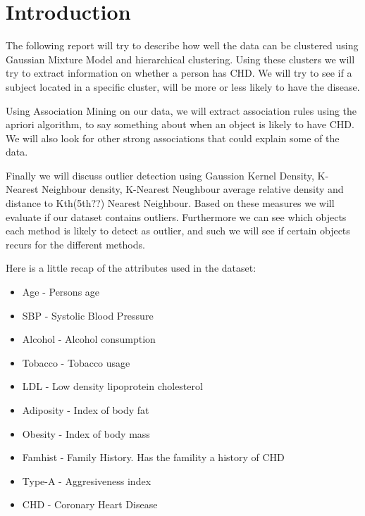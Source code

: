 \section{Introduction}
The following report will try to describe how well the data can be clustered using Gaussian Mixture Model and hierarchical clustering. Using these clusters we will try to extract information on whether a person has CHD. We will try to see if a subject located in a specific cluster, will be more or less likely to have the disease.

Using Association Mining on our data, we will extract association rules using the apriori algorithm, to say something about when an object is likely to have CHD. We will also look for other strong associations that could explain some of the data.

Finally we will discuss outlier detection using Gaussion Kernel Density, K-Nearest Neighbour density, K-Nearest Neughbour average relative density and distance to Kth(5th??) Nearest Neighbour. Based on these measures we will evaluate if our dataset contains outliers. Furthermore we can see which objects each method is likely to detect as outlier, and such we will see if certain objects recurs for the different methods.

Here is a little recap of the attributes used in the dataset:
\begin{itemize}
\item Age - Persons age
\item SBP - Systolic Blood Pressure
\item Alcohol - Alcohol consumption
\item Tobacco - Tobacco usage
\item LDL - Low density lipoprotein cholesterol
\item Adiposity - Index of body fat
\item Obesity - Index of body mass
\item Famhist - Family History. Has the famility a history of CHD
\item Type-A - Aggresiveness index
\item CHD - Coronary Heart Disease
\end{itemize}
